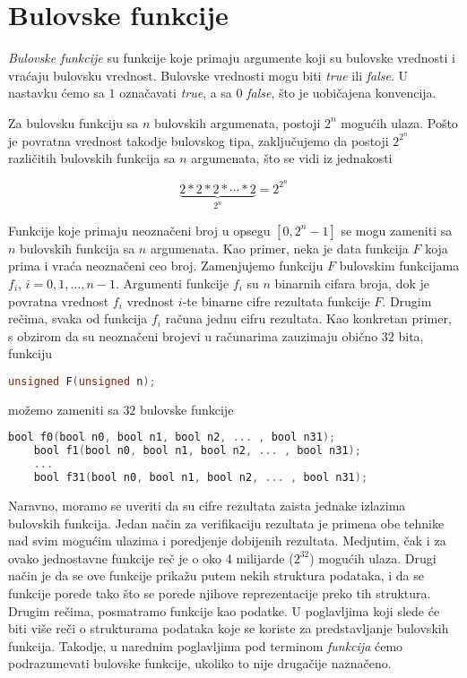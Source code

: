 \section{Bulovske funkcije}
\label{sec:BulovskeFunkcije}

\emph{Bulovske funkcije} su funkcije koje primaju argumente koji su bulovske vrednosti i vra\'c{}aju bulovsku vrednost. Bulovske vrednosti mogu biti \emph{true} ili \emph{false}. U nastavku \'c{}emo sa $1$ ozna\v{c}avati \emph{true}, a sa $0$ \emph{false}, \v{s}to je uobi\v{c}ajena konvencija.

Za bulovsku funkciju sa $n$ bulovskih argumenata, postoji $2^{n}$ mogu\'c{}ih ulaza. Po\v{s}to je povratna vrednost takodje bulovskog tipa, zaklju\v{c}ujemo da postoji $2^{2^{n}}$ razli\v{c}itih bulovskih funkcija sa $n$ argumenata, \v{s}to se vidi iz jednakosti

\[ \underbrace{2*2*2* \dotsb *2}_{\text{$2^{n}$}} = 2^{2^{n}} \]

Funkcije koje primaju neozna\v{c}eni broj u opsegu $[0,2^{n}-1]$ se mogu zameniti sa $n$ bulovskih funkcija sa $n$ argumenata. Kao primer, neka je data funkcija $F$ koja prima i vra\'c{}a neozna\v{c}eni ceo broj. Zamenjujemo funkciju $F$ bulovskim funkcijama $f_i$, $i = 0, 1, \dots , n-1$. Argumenti funkcije $f_{i}$ su $n$ binarnih cifara broja, dok je povratna vrednost $f_{i}$ vrednost $i$-te binarne cifre rezultata funkcije $F$. Drugim re\v{c}ima, svaka od funkcija $f_{i}$ ra\v{c}una jednu cifru rezultata. Kao konkretan primer, s obzirom da su neozna\v{c}eni brojevi u ra\v{c}unarima zauzimaju obi\v{c}no $32$ bita, funkciju

\begin{lstlisting}[language=C++]
    unsigned F(unsigned n);
\end{lstlisting}

\noindent mo\v{z}emo zameniti sa $32$ bulovske funkcije

\begin{lstlisting}[language=C, emph={bool}]
    bool f0(bool n0, bool n1, bool n2, ... , bool n31);
    bool f1(bool n0, bool n1, bool n2, ... , bool n31);
    ...
    bool f31(bool n0, bool n1, bool n2, ... , bool n31);
\end{lstlisting}

Naravno, moramo se uveriti da su cifre rezultata zaista jednake izlazima bulovskih funkcija. Jedan na\v{c}in za verifikaciju rezultata je primena obe tehnike nad svim mogu\'c{}im ulazima i poredjenje dobijenih rezultata. Medjutim, \v{c}ak i za ovako jednostavne funkcije re\v{c} je o oko 4 milijarde ($2^{32}$) mogu\'c{}ih ulaza. Drugi na\v{c}in je da se ove funkcije prika\v{z}u putem nekih struktura podataka, i da se funkcije porede tako \v{s}to se porede njihove reprezentacije preko tih struktura. Drugim re\v{c}ima, posmatramo funkcije kao podatke. U poglavljima koji slede \'c{}e biti vi\v{s}e re\v{c}i o strukturama podataka koje se koriste za predstavljanje bulovskih funkcija. Takodje, u narednim poglavljima pod terminom \emph{funkcija} \'c{}emo podrazumevati bulovske funkcije, ukoliko to nije druga\v{c}ije nazna\v{c}eno.
